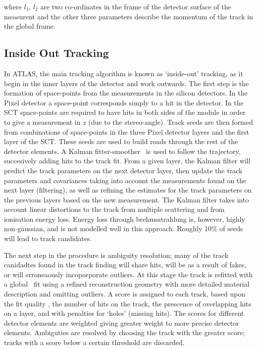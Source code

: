 where $l_{1}$, $l_{2}$ are two co-ordinates in the frame of the detector surface
of the measurent and the other three parameters describe the momentum of the track
in the global frame.

\subsection{Inside Out Tracking}

In ATLAS, the main tracking algorithm is known as `inside-out' tracking, as it
begin in the inner layers of the detector and work outwards. The first step is
the formation of space-points from the measurements in the silicon detectors. In
the Pixel detector a space-point corresponds simply to a hit in the detector. In
the SCT space-points are required to have hits in both sides of the module in
order to give a measurement in $z$ (due to the stereo-angle). Track seeds are
then formed from combinations of space-points in the three Pixel detector layers
and the first layer of the SCT. These seeds are used to build roads through the
rest of the detector elements. A Kalman fitter-smoother~\cite{Fruhwirth:1987fm} is used to follow the
trajectory, succesively adding hits to the track fit. From a given layer, the
Kalman filter will predict the track parameters on the next detector layer, then
update the track parameters and covariances taking into account the measurements
found on the next layer (filtering), as well as refining the estimates for the
track parameters on the previous layers based on the new measurement. The Kalman
filter takes into account linear distortions to the track from multiple
scattering and from ionisation energy loss. Energy loss through brehmsstrahlung
is, however, highly non-gaussian, and is not modelled well in this approach. Roughly
10\% of seeds will lead to track candidates.

The next step in the procedure is ambiguity resolution; many of the track
canidadtes found in the track finding will share hits, will be as a result of
fakes, or will erroneaously incoporporate outliers. At this stage the track is
refitted with a global \chisquared\ fit using a refined reconstruction geometry
with more detailed material description and omitting outliers. 
A score is assigned to each track, based upon the fit quality \chisquaredndof,
the number of hits on the track, the prescence of overlapping hits on a layer,
and with
penalties for `holes' (missing hits). The scores for different detector elements
are weighted giving greater weight to more precise detector elements. Ambiguties
are resolved by choosing the track with the greater score; tracks with a score
below a certain threshold are discarded.

